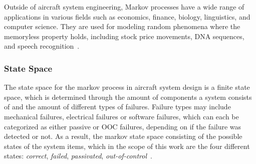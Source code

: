 Outside of aircraft system engineering, Markov processes have a wide range of applications in various fields such as economics, finance, biology, linguistics,
and computer science.
They are used for modeling random phenomena where the memoryless property holds,
including stock price movements, DNA sequences, and speech recognition~\cite{markov-usage}.

\subsubsection{State Space}\label{subsubsec:state-space}
The state space for the markov process in aircraft system design is a finite state space, which is determined through the amount of components
a system consists of and the amount of different types of failures.
Failure types may include mechanical failures, electrical failures or software failures, which can each be categorized as either
passive or \gls{OOC} failures, depending on if the failure was detected or not.
As a result, the markov state space consisting of the possible states of the system items, which in the scope of
this work are the four different states: \textit{correct}, \textit{failed}, \textit{passivated}, \textit{out-of-control}~\cite{markov-processes}.

